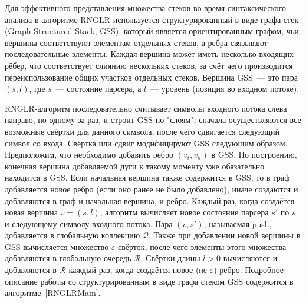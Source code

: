Для эффективного представления множества стеков во время синтаксического анализа в алгоритме RNGLR используется структурированный в виде графа стек (Graph Structured Stack, GSS), который является ориентированным графом, чьи вершины соответствуют  элементам отдельных стеков, а ребра связывают последовательные элементы. Каждая вершина может иметь несколько входящих рёбер, что соответствует слиянию нескольких стеков, за счёт чего производится переиспользование общих участков отдельных стеков. Вершина GSS~--- это пара $(s,l)$, где $s$~--- состояние парсера, а $l$~--- уровень (позиция во входном потоке).

RNGLR-алгоритм последовательно считывает символы входного потока слева направо, по одному за раз, и строит GSS по "слоям": сначала осуществляются все возможные свёртки для данного символа, после чего сдвигается следующий символ со входа. Свёртка или сдвиг модифицируют GSS следующим образом. Предположим, что необходимо добавить ребро $(v_t,v_h)$ в GSS. По построению, конечная вершина добавляемой дуги к такому моменту уже обязательно находится в GSS. Если начальная вершина также содержится в GSS, то в граф добавляется новое ребро (если оно ранее не было добавлено), иначе создаются и добавляются в граф и начальная вершина, и ребро. Каждый раз, когда создаётся новая вершина $v=(s,l)$, алгоритм вычисляет новое состояние парсера $s'$ по $s$ и следующему символу входного потока. Пара $(v,s')$, называемая push, добавляется в глобальную коллекцию $\mathcal{Q}$. Также при добавлении новой вершины в GSS вычисляется множество $\varepsilon$-свёрток, после чего элементы этого множества добавляются в глобальную очередь $\mathcal{R}$. Свёртки длины $l>0$ вычисляются и добавляются в $\mathcal{R}$ каждый раз, когда создаётся новое (не-$\varepsilon$) ребро. Подробное описание работы со структурированным в виде графа стеком GSS содержится в алгоритме~\ref{RNGLRMain}.

